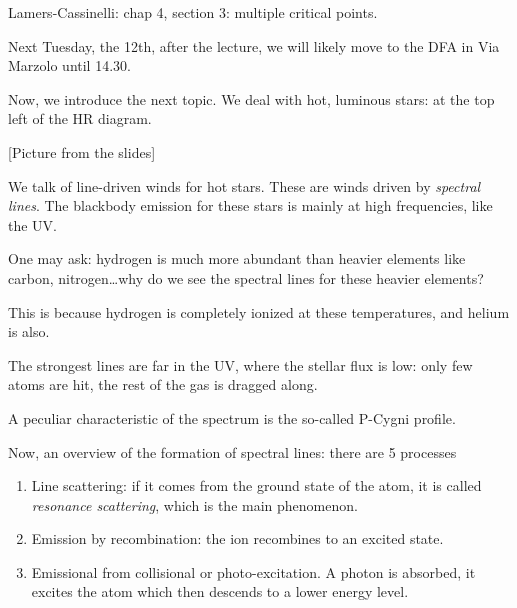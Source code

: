\documentclass[main.tex]{subfiles}
\begin{document}
Lamers-Cassinelli: chap 4, section 3: multiple critical points.

Next Tuesday, the 12th, after the lecture, we will likely move to the DFA in Via Marzolo until 14.30.

Now, we introduce the next topic.
We deal with hot, luminous stars: at the top left of the HR diagram.

[Picture from the slides]

We talk of line-driven winds for hot stars.
These are winds driven by \emph{spectral lines}. 
The blackbody emission for these stars is mainly at high frequencies, like the UV.

One may ask: hydrogen is much more abundant than heavier elements like carbon, nitrogen\dots why do we see the spectral lines for these heavier elements?

This is because hydrogen is completely ionized at these temperatures, and helium is also.

The strongest lines are far in the UV, where the stellar flux is low: only few atoms are hit, the rest of the gas is dragged along.

A peculiar characteristic of the spectrum is the so-called P-Cygni profile.

Now, an overview of the formation of spectral lines:
there are 5 processes \begin{enumerate}
    \item Line scattering: if it comes from the ground state of the atom, it is called \emph{resonance scattering}, which is the main phenomenon.
    \item Emission by recombination: the ion recombines to an excited state.
    \item Emissional from collisional or photo-excitation. A photon is absorbed, it excites the atom which then descends to a lower energy level.
\end{enumerate}
\end{document}
